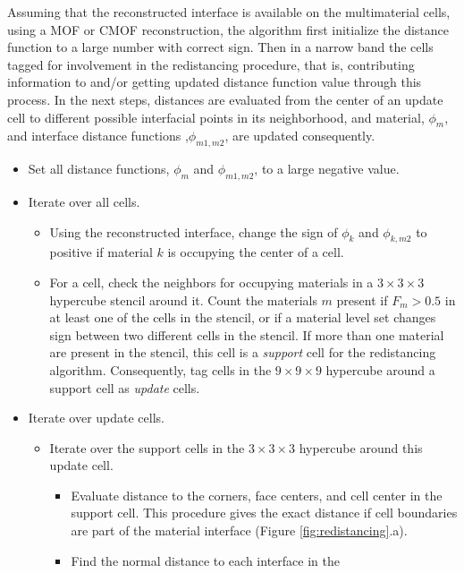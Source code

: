 \documentclass[]{article}
\begin{document}
Assuming that the reconstructed interface is available on the multimaterial cells, using a MOF or CMOF reconstruction, the algorithm first initialize the distance function to a large number with correct sign. Then in a narrow band the cells tagged for involvement in the redistancing procedure, that is, contributing information to and/or getting updated distance function value through this process. In the next steps, distances are evaluated from the center of an update cell to different possible interfacial points in its neighborhood, and material, $\phi_m$, and interface distance functions ,$\phi_{m1,m2}$, are updated consequently.

\begin{itemize}
\item Set all distance functions, $\phi_m$ and $\phi_{m1,m2}$, 
to a large negative value.
\item Iterate over all cells.  
  \begin{itemize}
  \item Using the reconstructed interface, change the sign of 
    $\phi_k$ and $\phi_{k,m2}$ to positive if material 
    $k$ is occupying the
    center of a cell.
  \item For a cell, check the neighbors for 
    occupying materials in a  $3 \times 3 \times 3$ 
    hypercube stencil around it. Count the
    materials $m$ present if $F_m>0.5$ in at 
    least one of the cells in the stencil, or if a 
    material level set changes sign between two 
    different cells in the stencil. If more than one 
    material are present in the stencil, this cell is 
    a \emph{support} cell for the redistancing 
    algorithm. Consequently, tag cells in the $9 \times 9 \times 9$ 
    hypercube around a support cell as \emph{update} cells.
 \end{itemize}
 \item Iterate over update cells.
   \begin{itemize}
   \item Iterate over the support cells in the $3 \times 3 \times 3$  
    hypercube around this update cell. 
     \begin{itemize}
     \item Evaluate distance to the corners, face centers, and 
      cell center in the support cell. This procedure gives 
      the exact distance if cell boundaries are 
      part of the material interface (Figure \ref{fig:redistancing}.a).
     \item Find the normal distance to each interface in the 

\end{itemize}
\end{itemize}
\end{itemize}
\end{document}
